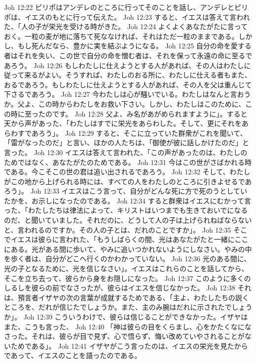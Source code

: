 Joh 12:22  ピリポはアンデレのところに行ってそのことを話し、アンデレとピリポは、イエスのもとに行って伝えた。
Joh 12:23  すると、イエスは答えて言われた、「人の子が栄光を受ける時がきた。
Joh 12:24  よくよくあなたがたに言っておく。一粒の麦が地に落ちて死ななければ、それはただ一粒のままである。しかし、もし死んだなら、豊かに実を結ぶようになる。
Joh 12:25  自分の命を愛する者はそれを失い、この世で自分の命を憎む者は、それを保って永遠の命に至るであろう。
Joh 12:26  もしわたしに仕えようとする人があれば、その人はわたしに従って来るがよい。そうすれば、わたしのおる所に、わたしに仕える者もまた、おるであろう。もしわたしに仕えようとする人があれば、その人を父は重んじて下さるであろう。
Joh 12:27  今わたしは心が騒いでいる。わたしはなんと言おうか。父よ、この時からわたしをお救い下さい。しかし、わたしはこのために、この時に至ったのです。
Joh 12:28  父よ、み名があがめられますように」。すると天から声があった、「わたしはすでに栄光をあらわした。そして、更にそれをあらわすであろう」。
Joh 12:29  すると、そこに立っていた群衆がこれを聞いて、「雷がなったのだ」と言い、ほかの人たちは、「御使が彼に話しかけたのだ」と言った。
Joh 12:30  イエスは答えて言われた、「この声があったのは、わたしのためではなく、あなたがたのためである。
Joh 12:31  今はこの世がさばかれる時である。今こそこの世の君は追い出されるであろう。
Joh 12:32  そして、わたしがこの地から上げられる時には、すべての人をわたしのところに引きよせるであろう」。
Joh 12:33  イエスはこう言って、自分がどんな死に方で死のうとしていたかを、お示しになったのである。
Joh 12:34  すると群衆はイエスにむかって言った、「わたしたちは律法によって、キリストはいつまでも生きておいでになるのだ、と聞いていました。それだのに、どうして人の子は上げられねばならないと、言われるのですか。その人の子とは、だれのことですか」。
Joh 12:35  そこでイエスは彼らに言われた、「もうしばらくの間、光はあなたがたと一緒にここにある。光がある間に歩いて、やみに追いつかれないようにしなさい。やみの中を歩く者は、自分がどこへ行くのかわかっていない。
Joh 12:36  光のある間に、光の子となるために、光を信じなさい」。イエスはこれらのことを話してから、そこを立ち去って、彼らから身をお隠しになった。
Joh 12:37  このように多くのしるしを彼らの前でなさったが、彼らはイエスを信じなかった。
Joh 12:38  それは、預言者イザヤの次の言葉が成就するためである、「主よ、わたしたちの説くところを、だれが信じたでしょうか。また、主のみ腕はだれに示されたでしょうか」。
Joh 12:39  こういうわけで、彼らは信じることができなかった。イザヤはまた、こうも言った、
Joh 12:40  「神は彼らの目をくらまし、心をかたくなになさった。それは、彼らが目で見ず、心で悟らず、悔い改めていやされることがないためである」。
Joh 12:41  イザヤがこう言ったのは、イエスの栄光を見たからであって、イエスのことを語ったのである。
